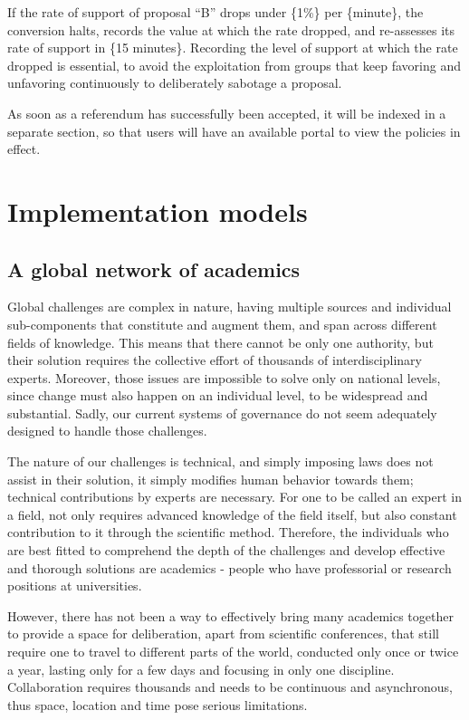 \documentclass[a4paper,11pt]{article}
\begin{document}
\begin{multicols}{2}
If the rate of support of proposal “B” drops under \{1\%\} per \{minute\}, the conversion halts, records the value at which the rate dropped, and re-assesses its rate of support in \{15 minutes\}. Recording the level of support at which the rate dropped is essential, to avoid the exploitation from groups that keep favoring and unfavoring continuously to deliberately sabotage a proposal.

As soon as a referendum has successfully been accepted, it will be indexed in a separate section, so that users will have an available portal to view the policies in effect.

\section{Implementation models} \label{implementation}

\subsection{A global network of academics} \label{academics}

Global challenges are complex in nature, having multiple sources and individual sub-components that constitute and augment them, and span across different fields of knowledge. This means that there cannot be only one authority, but their solution requires the collective effort of thousands of interdisciplinary experts. Moreover, those issues are impossible to solve only on national levels, since change must also happen on an individual level, to be widespread and substantial. Sadly, our current systems of governance do not seem adequately designed to handle those challenges.

The nature of our challenges is technical, and simply imposing laws does not assist in their solution, it simply modifies human behavior towards them; technical contributions by experts are necessary. For one to be called an expert in a field, not only requires advanced knowledge of the field itself, but also constant contribution to it through the scientific method. Therefore, the individuals who are best fitted to comprehend the depth of the challenges and develop effective and thorough solutions are academics - people who have professorial or research positions at universities.

However, there has not been a way to effectively bring many academics together to provide a space for deliberation, apart from scientific conferences, that still require one to travel to different parts of the world, conducted only once or twice a year, lasting only for a few days and focusing in only one discipline. Collaboration requires thousands and needs to be continuous and asynchronous, thus space, location and time pose serious limitations.


\end{multicols}
\end{document}
